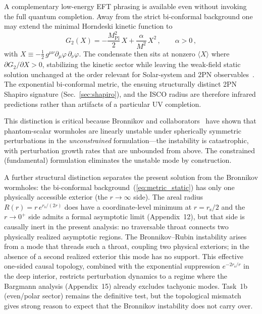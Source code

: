 \documentclass[aps,prd,onecolumn,superscriptaddress,nofootinbib,showpacs,12pt]{revtex4-2}
\newcommand{\Mpl}{M_{\mathrm{Pl}}}
\newcommand{\half}{\tfrac{1}{2}}
\newcommand{\rs}{r_{\mathrm{s}}}
\begin{document}
A complementary low-energy EFT phrasing is available even
without invoking the full quantum completion.  Away from the
strict bi-conformal background one may extend the minimal
Horndeski kinetic function to
\begin{equation}\label{eq:ghost_condensation}
  G_{2}(X) = -\frac{\Mpl^{2}}{2}\,X
    + \frac{\alpha}{M^{2}}\,X^{2}\,,
    \qquad \alpha > 0\,,
\end{equation}
with $X \equiv -\half\,g^{\mu\nu}\partial_{\mu}\varphi\,
\partial_{\nu}\varphi$.  The condensate then sits at nonzero
$\langle X\rangle$ where $\partial G_{2}/\partial X > 0$,
stabilizing the kinetic sector while leaving the weak-field
static solution unchanged at the order relevant for Solar-system
and 2PN observables~\cite{ArkaniHamed2004}.  The exponential
bi-conformal metric, the ensuing structurally distinct 2PN
Shapiro signature (Sec.~\ref{sec:shapiro}), and the ISCO radius
are therefore infrared predictions rather than artifacts of a
particular UV completion.

This distinction is critical because Bronnikov and
collaborators~\cite{Bronnikov2012} have shown that
phantom-scalar wormholes are linearly unstable under
spherically symmetric perturbations in the
\emph{unconstrained} formulation---the instability is
catastrophic, with perturbation growth rates that are
unbounded from above.  The constrained (fundamental)
formulation eliminates the unstable mode by construction.

A further structural distinction separates the present
solution from the Bronnikov wormholes: the bi-conformal
background~(\ref{eq:metric_static}) has only one physically
accessible exterior (the $r \to \infty$ side).  The areal
radius $R(r) = r\,e^{\rs/(2r)}$ does have a coordinate-level
minimum at $r = \rs/2$ and the $r \to 0^{+}$ side admits a
formal asymptotic limit (Appendix~12), but that side is
causally inert in the present analysis: no traversable
throat connects two physically realized asymptotic regions.
The Bronnikov--Rubin instability arises from a mode that
threads such a throat, coupling two physical exteriors; in
the absence of a second realized exterior this mode has no
support.  This effective one-sided causal topology, combined
with the exponential suppression
$e^{-2\rs/r}$ in the deep interior, restricts perturbation
dynamics to a regime where the Bargmann analysis
(Appendix~15) already excludes tachyonic modes.  Task~1b
(even/polar sector) remains the definitive test, but the
topological mismatch gives strong reason to expect that
the Bronnikov instability does not carry over.
\end{document}
